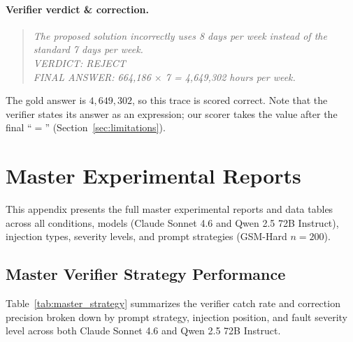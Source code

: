 \documentclass[11pt]{article}
\begin{document}
\paragraph{Verifier verdict \& correction.}
\begin{quote}
\textit{The proposed solution incorrectly uses 8 days per week instead of the standard 7 days
per week.\\
VERDICT: REJECT\\
FINAL ANSWER: 664,186 $\times$ 7 = 4,649,302 hours per week.}
\end{quote}

\noindent The gold answer is $4{,}649{,}302$, so this trace is scored correct. Note that the
verifier states its answer as an expression; our scorer takes the value after the final
``$=$'' (Section~\ref{sec:limitations}).

\section{Master Experimental Reports}\label{sec:appendix_reports}

This appendix presents the full master experimental reports and data tables across all conditions, models (Claude Sonnet 4.6 and Qwen 2.5 72B Instruct), injection types, severity levels, and prompt strategies (GSM-Hard $n=200$).

\subsection{Master Verifier Strategy Performance}
Table~\ref{tab:master_strategy} summarizes the verifier catch rate and correction precision broken down by prompt strategy, injection position, and fault severity level across both Claude Sonnet 4.6 and Qwen 2.5 72B Instruct.
\end{document}
